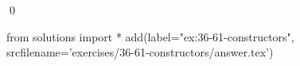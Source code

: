 
\begin{ex}
  \label{ex:36-61-constructors}
  
  \qed
\end{ex}
\begin{python0}
from solutions import *
add(label="ex:36-61-constructors",
    srcfilename='exercises/36-61-constructors/answer.tex')
\end{python0}
